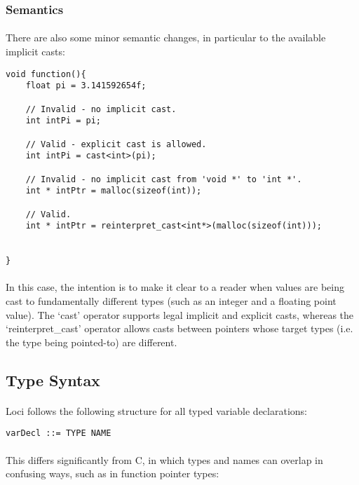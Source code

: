 \documentclass[12pt,twoside,notitlepage]{report}
\begin{document}
\subsubsection{Semantics}

\paragraph{}
There are also some minor semantic changes, in particular to the available implicit casts:


\begin{lstlisting}
void function(){
	float pi = 3.141592654f;
	
	// Invalid - no implicit cast.
	int intPi = pi;
	
	// Valid - explicit cast is allowed.
	int intPi = cast<int>(pi);
	
	// Invalid - no implicit cast from 'void *' to 'int *'.
	int * intPtr = malloc(sizeof(int));
	
	// Valid.
	int * intPtr = reinterpret_cast<int*>(malloc(sizeof(int)));
	
	
}
\end{lstlisting}


\paragraph{}
In this case, the intention is to make it clear to a reader when values are being cast to fundamentally different types (such as an integer and a floating point value). The `cast' operator supports legal implicit and explicit casts, whereas the `reinterpret\_cast' operator allows casts between pointers whose target types (i.e. the type being pointed-to) are different.

\clearpage

\subsection{Type Syntax}

\paragraph{}
Loci follows the following structure for all typed variable declarations:

\begin{lstlisting}
varDecl ::= TYPE NAME
\end{lstlisting}

\paragraph{}
This differs significantly from C, in which types and names can overlap in confusing ways, such as in function pointer types:
\end{document}
